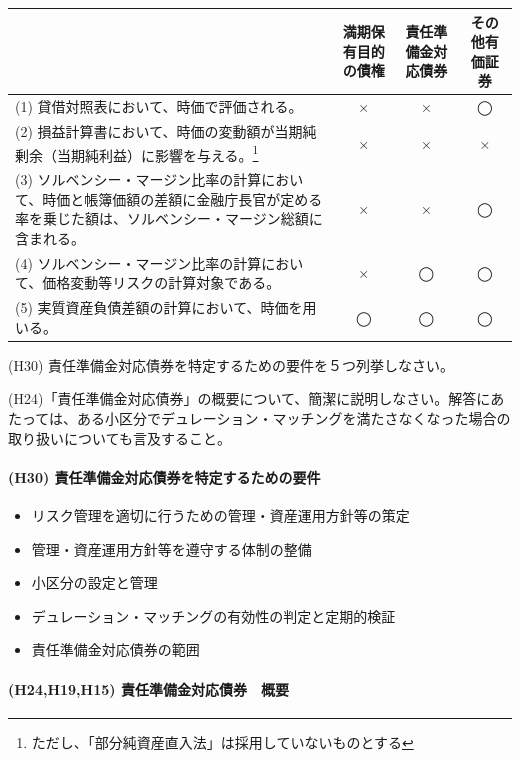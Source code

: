 \documentclass[report,gutter=10mm,fore-edge=10mm,uplatex,dvipdfmx]{jlreq}
\begin{document}

\begin{tabularx}{\linewidth}{|X|c|c|c|}
\hline
 &満期保有目的の債権 &責任準備金対応債券 & その他有価証券 \\ \hline
(1) 貸借対照表において、時価で評価される。&× &× &◯ \\ \hline
(2) 損益計算書において、時価の変動額が当期純剰余（当期純利益）に影響を与える。\footnote{ただし、「部分純資産直入法」は採用していないものとする}&× &× &× \\ \hline
(3) ソルベンシー・マージン比率の計算において、時価と帳簿価額の差額に金融庁長官が定める率を乗じた額は、ソルベンシー・マージン総額に含まれる。&× &× &◯ \\ \hline
(4) ソルベンシー・マージン比率の計算において、価格変動等リスクの計算対象である。&×& ◯&◯\\ \hline
(5) 実質資産負債差額の計算において、時価を用いる。&◯&◯&◯\\ \hline
\end{tabularx}


(H30) 責任準備金対応債券を特定するための要件を５つ列挙しなさい。

(H24)「責任準備金対応債券」の概要について、簡潔に説明しなさい。解答にあたっては、ある小区分でデュレーション・マッチングを満たさなくなった場合の取り扱いについても言及すること。


\paragraph{(H30) 責任準備金対応債券を特定するための要件}

\begin{itemize}
\item リスク管理を適切に行うための管理・資産運用方針等の策定
\item 管理・資産運用方針等を遵守する体制の整備 
\item 小区分の設定と管理
\item デュレーション・マッチングの有効性の判定と定期的検証
\item 責任準備金対応債券の範囲
\end{itemize}

\paragraph{(H24,H19,H15) 責任準備金対応債券　概要}
\end{document}
